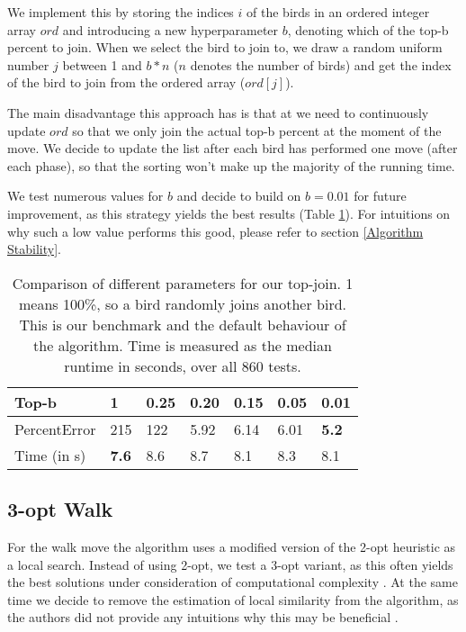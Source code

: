 We implement this by storing the indices $i$ of the birds in an ordered integer array $ord$ and introducing a new hyperparameter $b$, denoting which of the top-b percent to join. When we select the bird to join to, we draw a random uniform number $j$ between 1 and $b*n$ ($n$ denotes the number of birds) and get the index of the bird to join from the ordered array ($ord[j]$).

The main disadvantage this approach has is that at we need to continuously update $ord$ so that we only join the actual top-b percent at the moment of the move. We decide to update the list after each bird has performed one move (after each phase), so that the sorting won't make up the majority of the running time.

We test numerous values for $b$ and decide to build on $b=0.01$ for future improvement, as this strategy yields the best results (Table \ref{top_b_performance}). For intuitions on why such a low value performs this good, please refer to section \ref{Algorithm Stability}.

\begin{table}[h!]
\centering
\begin{tabular}{ |p{1.5cm}||p{0.75cm}|p{0.75cm}|p{0.75cm}|p{0.75cm}|p{0.75cm}|p{0.75cm}|  }
 \hline
 Top-b& 1 & 0.25 & 0.20 & 0.15 & 0.05 & \textbf{0.01}\\
\hline \hline
 PercentError & 215 &122 & 5.92 &  6.14 & 6.01 & \textbf{5.2}\\
 \hline
 Time (in s) & \textbf{7.6} & 8.6 & 8.7 &  8.1 & 8.3 & 8.1\\
 \hline
\end{tabular}
\caption{Comparison of different parameters for our top-join. 1 means 100\%, so a bird randomly joins another bird. This is our benchmark and the
default behaviour of the algorithm. Time is measured as the median runtime in seconds, over all 860 tests.}
\label{top_b_performance}
\end{table}

\subsection{3-opt Walk}

For the walk move the algorithm uses a modified version of the 2-opt heuristic as a local search. Instead of using 2-opt, we test a 3-opt variant, as this often yields the best solutions under consideration of computational complexity \cite{lin}. At the same time we decide to remove the estimation of local similarity from the algorithm, as the authors did not provide any intuitions why this may be beneficial \cite{afb}.

